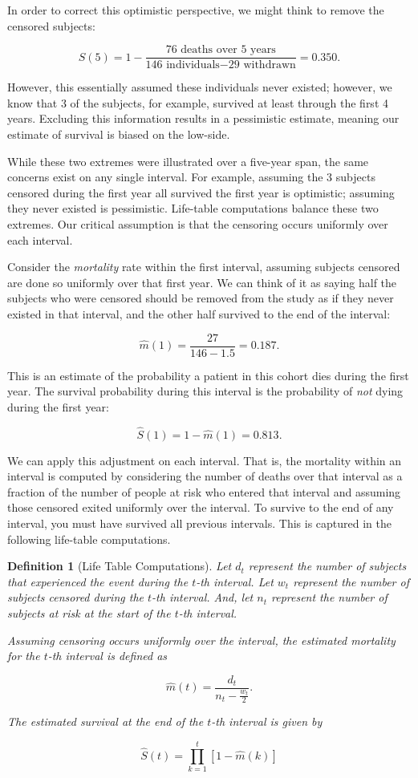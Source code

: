 \documentclass[
]{book}
\theoremstyle{plain}
\theoremstyle{mydefn}
\newtheorem{definition}{Definition}[chapter]
\theoremstyle{myexmpl}
\theoremstyle{remark}
\begin{document}
In order to correct this optimistic perspective, we might think to remove the censored subjects:

\[S(5) = 1 - \frac{\text{76 deaths over 5 years}}{\text{146 individuals} - \text{29 withdrawn}} = 0.350.\]

However, this essentially assumed these individuals never existed; however, we know that 3 of the subjects, for example, survived at least through the first 4 years. Excluding this information results in a pessimistic estimate, meaning our estimate of survival is biased on the low-side.

While these two extremes were illustrated over a five-year span, the same concerns exist on any single interval. For example, assuming the 3 subjects censored during the first year all survived the first year is optimistic; assuming they never existed is pessimistic. Life-table computations balance these two extremes. Our critical assumption is that the censoring occurs uniformly over each interval.

Consider the \emph{mortality} rate within the first interval, assuming subjects censored are done so uniformly over that first year. We can think of it as saying half the subjects who were censored should be removed from the study as if they never existed in that interval, and the other half survived to the end of the interval:

\[\widehat{m}(1) = \frac{27}{146 - 1.5} = 0.187.\]

This is an estimate of the probability a patient in this cohort dies during the first year. The survival probability during this interval is the probability of \emph{not} dying during the first year:

\[\widehat{S}(1) = 1 - \widehat{m}(1) = 0.813.\]

We can apply this adjustment on each interval. That is, the mortality within an interval is computed by considering the number of deaths over that interval as a fraction of the number of people at risk who entered that interval and assuming those censored exited uniformly over the interval. To survive to the end of any interval, you must have survived all previous intervals. This is captured in the following life-table computations.

\begin{definition}[Life Table Computations]
Let \(d_t\) represent the number of subjects that experienced the event during the \(t\)-th interval. Let \(w_t\) represent the number of subjects censored during the \(t\)-th interval. And, let \(n_{t}\) represent the number of subjects at risk at the start of the \(t\)-th interval.

Assuming censoring occurs uniformly over the interval, the estimated \emph{mortality} for the \(t\)-th interval is defined as

\[\widehat{m}(t) = \frac{d_t}{n_t - \frac{w_t}{2}}.\]

The estimated survival at the end of the \(t\)-th interval is given by

\[\widehat{S}(t) = \prod_{k=1}^{t} \left[1 - \widehat{m}(k)\right]\]
\end{definition}
\end{document}
